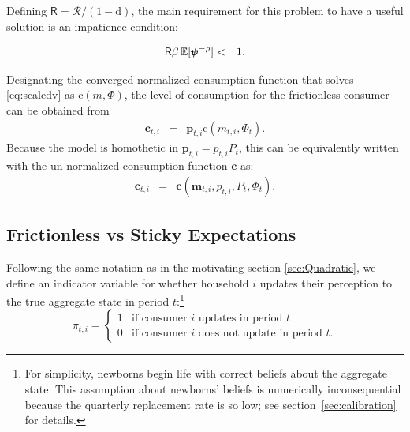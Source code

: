 \documentclass[titlepage]{./econtex}
\begin{document}
Defining $\mathsf{R} = \mathscr{R}\big/(1-\mathrm{d})$, the main requirement for this problem to have a useful solution is an impatience condition: 

\begin{eqnarray*}
  \label{eq:impatience}
  \mathsf{R} \beta  \operatorname{\mathbb{E}}[ \pmb{\psi}^{-\rho}]  & < & 1.
\end{eqnarray*}
 
Designating the converged normalized consumption function that solves \eqref{eq:scaledv} as
$\mathrm{c}(m,\Phi)$, the level of consumption for the frictionless consumer can be obtained from
\begin{eqnarray}
  \label{eq:cFlevel}
   \mathbf{c}_{t,i} & = & \pmb{p}_{t,i} \mathrm{c}(m_{t,i},\Phi_t)  \nonumber
.
\end{eqnarray}
 Because the model is homothetic in $\pmb{p}_{t,i}={p}_{t,i} {P}_{t}$, this can be equivalently written with the un-normalized consumption function $\textbf{c}$ as:
\begin{eqnarray*}
\mathbf{c}_{t,i} & = & \textbf{c}(\mathbf{m}_{t,i}, p_{t,i}, {P}_t, {\Phi}_t).
\end{eqnarray*}


\subsection{Frictionless vs Sticky Expectations}\label{sec:StickySOE}

Following the same notation as in the motivating section \ref{sec:Quadratic}, we define an indicator variable for whether household $i$ updates their perception to the true aggregate state in period $t$:\footnote{For simplicity, newborns begin life with correct beliefs about the aggregate state.  This assumption about newborns' beliefs is numerically inconsequential because the quarterly replacement rate is so low; see section~\ref{sec:calibration} for details.}
\begin{equation*}
\pi_{t,i} =
\begin{cases}
   1 & \text{if consumer $i$ updates in period $t$}
\\ 0 & \text{if consumer $i$ does not update in period $t$}.
\end{cases}
\end{equation*}
\end{document}
